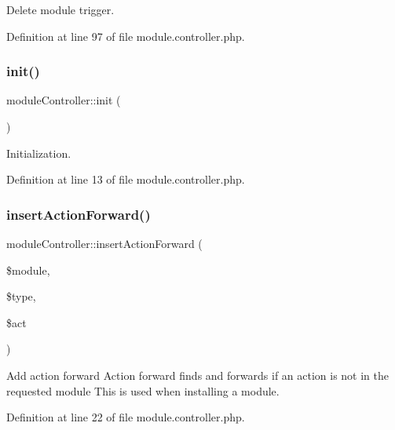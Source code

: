 Delete module trigger. 



Definition at line 97 of file module.\+controller.\+php.

\mbox{\label{classmoduleController_a589d3d74f4601ae495a33d001ad8ffa0}} 
\subsubsection{\texorpdfstring{init()}{init()}}
{\footnotesize\ttfamily module\+Controller\+::init (\begin{DoxyParamCaption}{ }\end{DoxyParamCaption})}



Initialization. 



Definition at line 13 of file module.\+controller.\+php.

\mbox{\label{classmoduleController_a9a5ff2def7412c659594c62a4615a0cd}} 
\subsubsection{\texorpdfstring{insert\+Action\+Forward()}{insertActionForward()}}
{\footnotesize\ttfamily module\+Controller\+::insert\+Action\+Forward (\begin{DoxyParamCaption}\item[{}]{\$module,  }\item[{}]{\$type,  }\item[{}]{\$act }\end{DoxyParamCaption})}



Add action forward Action forward finds and forwards if an action is not in the requested module This is used when installing a module. 



Definition at line 22 of file module.\+controller.\+php.

\mbox{\label{classmoduleController_af50247418fd7c87424958e95ea466b00}} 
